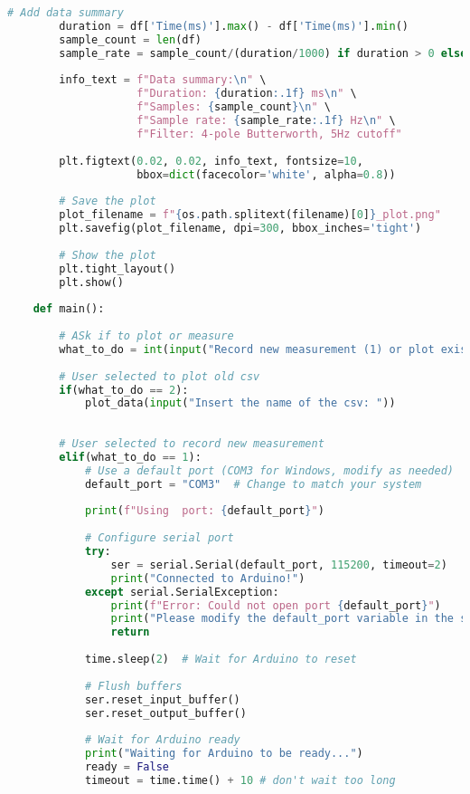 \begin{lstlisting}[style=pythonstyle, caption=Python Serial Receive Script, label=lst:pythonCodeApp, language=Python ]
        # Add data summary
        duration = df['Time(ms)'].max() - df['Time(ms)'].min()
        sample_count = len(df)
        sample_rate = sample_count/(duration/1000) if duration > 0 else 0
        
        info_text = f"Data summary:\n" \
                    f"Duration: {duration:.1f} ms\n" \
                    f"Samples: {sample_count}\n" \
                    f"Sample rate: {sample_rate:.1f} Hz\n" \
                    f"Filter: 4-pole Butterworth, 5Hz cutoff"
                    
        plt.figtext(0.02, 0.02, info_text, fontsize=10, 
                    bbox=dict(facecolor='white', alpha=0.8))
        
        # Save the plot
        plot_filename = f"{os.path.splitext(filename)[0]}_plot.png"
        plt.savefig(plot_filename, dpi=300, bbox_inches='tight')
        
        # Show the plot
        plt.tight_layout()
        plt.show()
    
    def main():
    
        # ASk if to plot or measure
        what_to_do = int(input("Record new measurement (1) or plot existing (2): "))
    
        # User selected to plot old csv
        if(what_to_do == 2):
            plot_data(input("Insert the name of the csv: "))
        
    
        # User selected to record new measurement
        elif(what_to_do == 1):
            # Use a default port (COM3 for Windows, modify as needed)
            default_port = "COM3"  # Change to match your system
            
            print(f"Using  port: {default_port}")
            
            # Configure serial port
            try:
                ser = serial.Serial(default_port, 115200, timeout=2)
                print("Connected to Arduino!")
            except serial.SerialException:
                print(f"Error: Could not open port {default_port}")
                print("Please modify the default_port variable in the script.")
                return
            
            time.sleep(2)  # Wait for Arduino to reset
            
            # Flush buffers
            ser.reset_input_buffer()
            ser.reset_output_buffer()
            
            # Wait for Arduino ready
            print("Waiting for Arduino to be ready...")
            ready = False
            timeout = time.time() + 10 # don't wait too long
            

\end{lstlisting}

